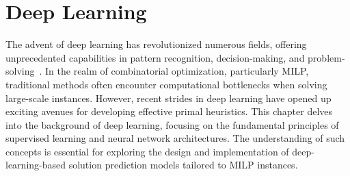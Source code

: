 

\chapter{Deep Learning}\label{chap:deep-learning}

The advent of deep learning has revolutionized numerous fields, offering unprecedented capabilities in pattern recognition, decision-making, and problem-solving~\cite{Goodfellow-et-al-2016}.
In the realm of combinatorial optimization, particularly MILP, traditional methods often encounter computational bottlenecks when solving large-scale instances.
However, recent strides in deep learning have opened up exciting avenues for developing effective primal heuristics.
This chapter delves into the background of deep learning, focusing on the fundamental principles of supervised learning and neural network architectures.
The understanding of such concepts is essential for exploring the design and implementation of deep-learning-based solution prediction models tailored to MILP instances.



